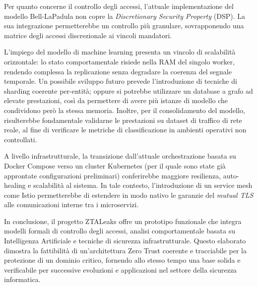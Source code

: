 Per quanto concerne il controllo degli accessi, l'attuale implementazione del modello Bell-LaPadula non copre la \textit{Discretionary Security Property} (DSP). La sua integrazione permetterebbe un controllo più granulare, sovrapponendo una matrice degli accessi discrezionale ai vincoli mandatori.

L'impiego del modello di machine learning presenta un vincolo di scalabilità orizzontale: lo stato comportamentale risiede nella RAM del singolo worker, rendendo complessa la replicazione senza degradare la coerenza del segnale temporale. Un possibile sviluppo futuro prevede l'introduzione di tecniche di sharding coerente per-entità; oppure si potrebbe utilizzare un database a grafo ad elevate prestazioni, così da permettere di avere più istanze di modello che condividono però la stessa memoria. Inoltre, per il consolidamento del modello, risulterebbe fondamentale validarne le prestazioni su dataset di traffico di rete reale, al fine di verificare le metriche di classificazione in ambienti operativi non controllati.

A livello infrastrutturale, la transizione dall'attuale orchestrazione basata su Docker Compose verso un cluster Kubernetes (per il quale sono state già approntate configurazioni preliminari) conferirebbe maggiore resilienza, auto-healing e scalabilità al sistema. In tale contesto, l'introduzione di un service mesh come Istio permetterebbe di estendere in modo nativo le garanzie del \textit{mutual TLS} alle comunicazioni interne tra i microservizi.

In conclusione, il progetto ZTALeaks offre un prototipo funzionale che integra modelli formali di controllo degli accessi, analisi comportamentale basata su Intelligenza Artificiale e tecniche di sicurezza infrastrutturale. Questo elaborato dimostra la fattibilità di un'architettura Zero Trust coerente e tracciabile per la protezione di un dominio critico, fornendo allo stesso tempo una base solida e verificabile per successive evoluzioni e applicazioni nel settore della sicurezza informatica.